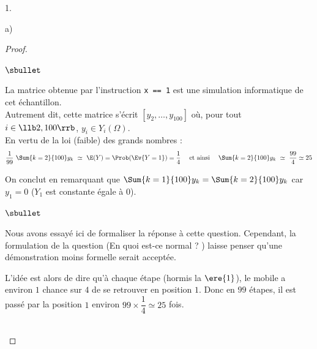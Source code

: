 \documentclass[11pt]{article}%
\begin{document}
\begin{noliste}{1.}
\begin{noliste}{a)}
\begin{proof}
\begin{noliste}{$\sbullet$}
      \item La matrice obtenue par l'instruction {\tt x == 1} est une
        simulation informatique de cet échantillon.\\
        Autrement dit, cette matrice s'écrit $[y_2, \ldots, y_{100}]$
        où, pour tout $i \in \llb 2, 100\rrb$, $y_i \in Y_i(\Omega)$.\\[.2cm]
        En vertu de la loi (faible) des grands nombres :
        \[
        \dfrac{1}{99} \ \Sum{k=2}{100} y_k \ \simeq \ \E(Y) =
        \Prob(\Ev{Y = 1}) = \dfrac{1}{4} \quad \text{ et ainsi } \quad
        \Sum{k=2}{100} y_k \ \simeq \ \dfrac{99}{4} \simeq 25
        \]       

      \item On conclut en remarquant que $\Sum{k=1}{100} y_k =
        \Sum{k=2}{100} y_k$ car $y_1 = 0$ ($Y_1$ est constante égale à
        $0$).
      \end{noliste}
      \begin{remark}%
        \begin{noliste}{$\sbullet$}
        \item Nous avons essayé ici de formaliser la réponse à cette
          question. Cependant, la formulation de la question (\og En
          quoi est-ce normal ? \fg{}) laisse penser qu'une
          démonstration moins formelle serait acceptée.
        \item L'idée est alors de dire qu'à chaque étape (hormis la
          $\ere{1}$), le mobile a environ $1$ chance sur $4$ de se
          retrouver en position $1$. Donc en $99$ étapes, il est passé
          par la position $1$ environ $99 \times \dfrac{1}{4} \simeq
          25$ fois.
        \end{noliste}
      \end{remark}~\\[-1.4cm]
    \end{proof}
  \end{noliste}
\end{noliste}
\end{document}
